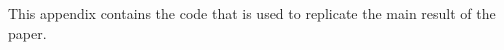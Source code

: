 \documentclass[12pt]{jfm}
\begin{document}




\newpage

\appendix

\section{}\label{appA}

This appendix contains the code that is used to replicate the main result of the paper.

%   





\end{document}
